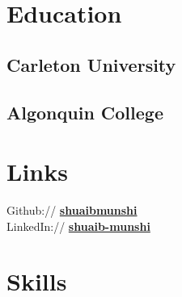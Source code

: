 \documentclass[letterpaper]{deedy-resume} %
\begin{document}
\begin{minipage}[t]{0.33\textwidth} %


\section{Education} 

\subsection{Carleton University}

\sectionspace %
\sectionspace %

\subsection{Algonquin College}


\sectionspace %
\sectionspace %


\section{Links} 

Github:// \href{https://github.com/shuaibmunshi}{\bf shuaibmunshi} \\
LinkedIn:// \href{https://www.linkedin.com/in/shuaib-munshi/}{\bf shuaib-munshi}

\sectionspace %
\sectionspace %

\section{Skills}


\end{minipage}
\end{document}
